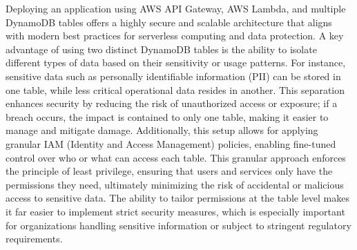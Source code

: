 Deploying an application using AWS API Gateway, AWS Lambda, and multiple DynamoDB tables offers a highly secure and scalable architecture that aligns with modern best practices for serverless computing and data protection. A key advantage of using two distinct DynamoDB tables is the ability to isolate different types of data based on their sensitivity or usage patterns. For instance, sensitive data such as personally identifiable information (PII) can be stored in one table, while less critical operational data resides in another. This separation enhances security by reducing the risk of unauthorized access or exposure; if a breach occurs, the impact is contained to only one table, making it easier to manage and mitigate damage. Additionally, this setup allows for applying granular IAM (Identity and Access Management) policies, enabling fine-tuned control over who or what can access each table. This granular approach enforces the principle of least privilege, ensuring that users and services only have the permissions they need, ultimately minimizing the risk of accidental or malicious access to sensitive data. The ability to tailor permissions at the table level makes it far easier to implement strict security measures, which is especially important for organizations handling sensitive information or subject to stringent regulatory requirements.



